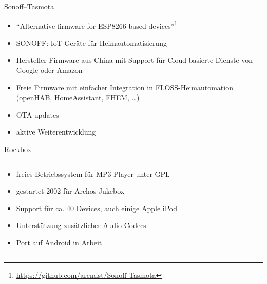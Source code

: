 \documentclass[t]{beamer}
\begin{document}
\begin{frame}{Sonoff--Tasmota}
    \begin{itemize}
        \item \enquote{Alternative firmware for ESP8266 based
            devices}\footnote{\url{https://github.com/arendst/Sonoff-Tasmota}}
        \item SONOFF: IoT-Geräte für Heimautomatisierung
        \item Hersteller-Firmware aus China mit Support für
            Cloud-basierte Dienste von Google oder Amazon
        \item Freie Firmware mit einfacher Integration in
            FLOSS-Heimautomation
            (\href{https://www.openhab.org/}{openHAB},
            \href{https://www.home-assistant.io/}{HomeAssistant},
            \href{https://wiki.fhem.de/wiki/Sonoff}{FHEM}, …)
        \item OTA updates
        \item aktive Weiterentwicklung
    \end{itemize}
\end{frame}

\begin{frame}{Rockbox}
    \begin{columns}[T]
        \begin{column}{0.45\textwidth}
            \begin{itemize}
                \item freies Betriebssystem für MP3-Player unter GPL
                \item gestartet 2002 für Archos Jukebox
                \item Support für ca. 40 Devices, auch einige Apple iPod
                \item Unterstützung zusätzlicher Audio-Codecs
                \item Port auf Android in Arbeit
            \end{itemize}
        \end{column}
        \begin{column}{0.5\textwidth}
        \end{column}
    \end{columns}
\end{frame}
\end{document}
